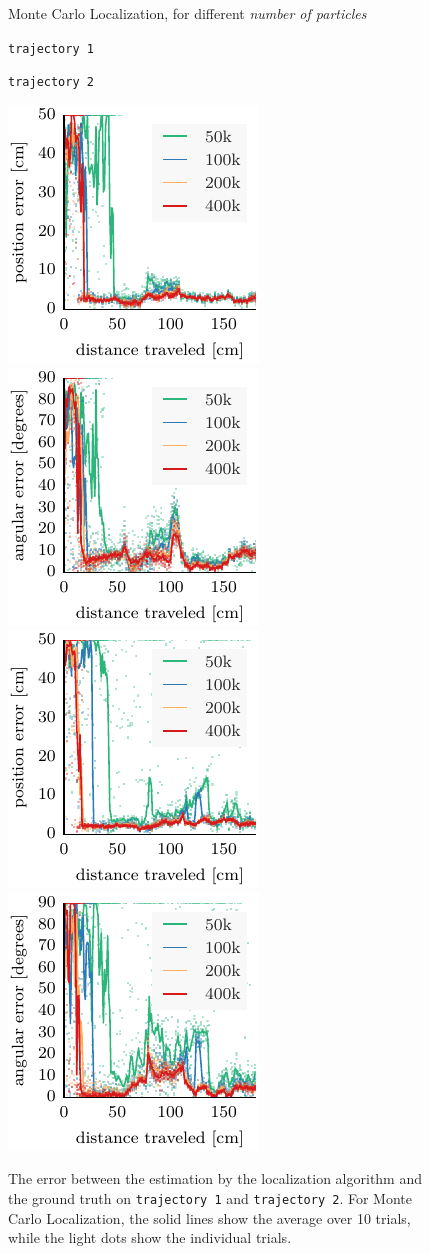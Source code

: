 \documentclass{svmult}
\begin{document}
\begin{figure}
\vspace{.3em}

\begin{center}
Monte Carlo Localization, for different \emph{number of particles}
\end{center}
\begin{minipage}{.5\columnwidth}
\begin{center}
\texttt{trajectory~1}
\end{center}
\end{minipage}
\hfill
\begin{minipage}{.5\columnwidth}
\begin{center}
\texttt{trajectory~2}
\end{center}
\end{minipage}


\vspace{.3em}

\includegraphics[width=.24\columnwidth]{mcl-whole_random_1-xy}\hfill
\includegraphics[width=.24\columnwidth]{mcl-whole_random_1-theta}\hfill
\includegraphics[width=.24\columnwidth]{mcl-whole_random_2-xy}\hfill
\includegraphics[width=.24\columnwidth]{mcl-whole_random_2-theta}

\caption{The error between the estimation by the localization algorithm and the ground truth on \texttt{trajectory~1} and \texttt{trajectory~2}.
For Monte Carlo Localization, the solid lines show the average over 10 trials, while the light dots show the individual trials.}
\label{fig:whole-runs-random12}
\end{figure}
\end{document}
